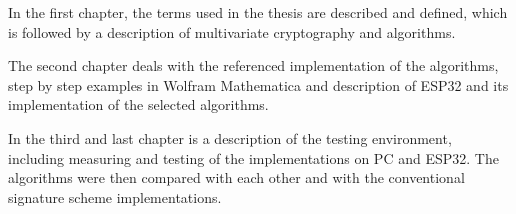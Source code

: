 \documentclass[thesis=M,english]{FITthesis}[2019/12/23]
\begin{document}
\bigskip
\noindent
In the first chapter, the terms used in the thesis are described and defined, which is followed by a description of multivariate cryptography and algorithms.

\bigskip
\noindent
The second chapter deals with the referenced implementation of the algorithms, step by step examples in Wolfram Mathematica and description of ESP32 and its implementation of the selected algorithms.

\bigskip
\noindent
In the third and last chapter is a description of the testing environment, including measuring and testing of the implementations on PC and ESP32. The algorithms were then compared with each other and with the conventional signature scheme implementations.



\end{document}
